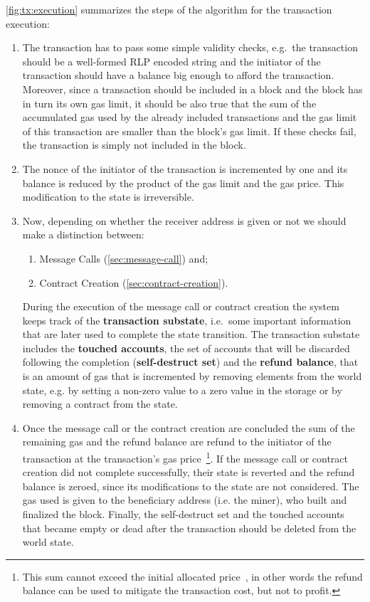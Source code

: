 \autoref{fig:tx:execution} summarizes the steps of the algorithm for the
transaction execution:
\begin{enumerate}
	\item The transaction has to pass some simple validity checks, e.g.\ the
	transaction should be a well-formed RLP encoded string and the initiator
	of the transaction should have a balance big enough to afford the
	transaction.
	Moreover, since a transaction should be included in a block and the block
	has in turn its own gas limit, it should be also true that the sum
	of the accumulated gas used by the already included transactions and the gas
	limit of this transaction are smaller than the block's gas limit.
	If these checks fail, the transaction is simply not included in the block.


	\item The nonce of the initiator of the transaction is incremented by one and its balance is reduced by the product of the gas limit and the gas price. This modification to the state is irreversible.
	\item Now, depending on whether the receiver address is given or not
	we should make a distinction between:
	\begin{enumerate}[label=\alph*.]
		\item Message Calls (\autoref{sec:message-call}) and;
		\item Contract Creation (\autoref{sec:contract-creation}).
	\end{enumerate}
	During the execution of the message call or contract creation the system
	keeps track of the \textbf{transaction substate}, i.e.\ some important
	information that are later used to complete the state transition.
	The transaction substate includes the \textbf{touched accounts}, the set of
	accounts that will be discarded following the completion
	(\textbf{self-destruct set}) and the
	\textbf{refund balance}, that is an amount of gas that is incremented by
	removing elements from the world state, e.g. by setting a non-zero value to
	a zero value in the storage or by removing a contract from the state.

	\item Once the message call or the contract creation are concluded
	the sum of the remaining gas and the refund balance are refund
	to the initiator of the transaction at the transaction's gas price~\footnote{This sum cannot exceed the initial allocated
	price~\cite{wood2018ethereum}, in other words the refund balance can be
	used to mitigate the transaction cost, but not to profit.}.
	If the message call or contract creation did not complete successfully,
	their state is reverted and the refund balance is zeroed, since its
	modifications to the state are not considered.
	The gas used is given to the beneficiary address (i.e. the miner), who
	built and finalized the block. Finally, the self-destruct set and the
	touched accounts that became empty or dead after the transaction should
	be deleted from the world  state.
\end{enumerate}


